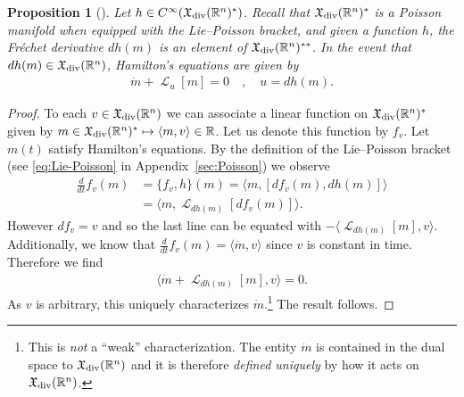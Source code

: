 \documentclass[12pt]{amsart}
\newcommand{\R}{\ensuremath{\mathbb{R}}}
\newtheorem{prop}[thm]{Proposition}
\DeclareMathOperator{\lie}{\mathcal{L}}
\begin{document}
  \begin{prop}[\cite{Arnold1966}] \label{prop:LPDiff}
  Let $h \in C^{\infty}( \mathfrak{X}_{\rm div}(\R^n)^* )$.
  Recall that $\mathfrak{X}_{\rm div}(\R^n)^*$ is a Poisson manifold
  when equipped with the Lie--Poisson bracket,
  and given a function $h$, the Fr\'echet derivative $dh(m)$ is an element  of $\mathfrak{X}_{\rm div}(\R^n)^{**}$.
  In the event that $dh(m) \in \mathfrak{X}_{\rm div}(\R^n)$,
  Hamilton's equations are given by
  \begin{align*}
    \dot{m} + \lie_u [m] = 0 \quad , \quad u = dh(m). %
  \end{align*}
\end{prop}
\begin{proof}
  To each $v \in \mathfrak{X}_{\rm div}(\R^n)$
  we can associate a linear function on $\mathfrak{X}_{\rm div}(\R^n)^*$
  given by $m \in \mathfrak{X}_{\rm div}(\R^n)^* \mapsto \langle m , v \rangle \in \R$.
  Let us denote this function by $f_v$.
  Let $m(t)$ satisfy Hamilton's equations.
  By the definition of the Lie--Poisson bracket
  (see \eqref{eq:Lie-Poisson} in Appendix~\ref{sec:Poisson})
  we observe
  \begin{align*}
    \frac{d}{dt} f_v(m) &= \{ f_v , h \}(m) = \langle m , [ df_v(m) , dh(m) ] \rangle \\
    &= \langle m , \lie_{dh(m)}[ df_v(m) ] \rangle.
  \end{align*}
  However $df_v = v$ and so
  the last line can be equated with  $-\langle \lie_{dh(m)}[m] , v \rangle$.
  Additionally, we know that $\frac{d}{dt} f_v(m) = \langle \dot{m} , v \rangle$ since $v$ is constant in time.
  Therefore we find
  \begin{align*}
    \langle \dot{m} + \lie_{dh(m)} [m] , v \rangle = 0.  
  \end{align*}
  As $v$ is arbitrary, this uniquely characterizes $\dot{m}$.\footnote{This is \emph{not} a ``weak'' characterization.  The entity $\dot{m}$ is
  contained in the dual space to $\mathfrak{X}_{\rm div}(\R^n)$ and it is
  therefore \emph{defined uniquely} by how it acts on $\mathfrak{X}_{\rm div}(\R^n)$.}
  The result follows.
\end{proof}
\end{document}
